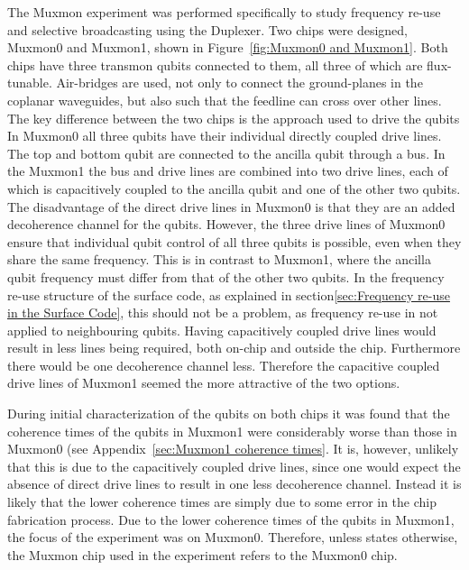       The Muxmon experiment was performed specifically to study frequency re-use and selective broadcasting using the Duplexer. Two chips were designed, Muxmon0 and Muxmon1, shown in Figure~\ref{fig:Muxmon0 and Muxmon1}. Both chips have three transmon qubits connected to them, all three of which are flux-tunable. Air-bridges are used, not only to connect the ground-planes in the coplanar waveguides, but also such that the feedline can cross over other lines. The key difference between the two chips is the approach used to drive the qubits In Muxmon0 all three qubits have their individual directly coupled drive lines. The top and bottom qubit are connected to the ancilla qubit through a bus. In the Muxmon1 the bus and drive lines are combined into two drive lines, each of which is capacitively coupled to the ancilla qubit and one of the other two qubits. The disadvantage of the direct drive lines in Muxmon0 is that they are an added decoherence channel for the qubits. However, the three drive lines of Muxmon0 ensure that individual qubit control of all three qubits is possible, even when they share the same frequency. This is in contrast to Muxmon1, where the ancilla qubit frequency must differ from that of the other two qubits. In the frequency re-use structure of the surface code, as explained in section\ref{sec:Frequency re-use in the Surface Code}, this should not be a problem, as frequency re-use in not applied to neighbouring qubits. Having capacitively coupled drive lines would result in less lines being required, both on-chip and outside the chip. Furthermore there would be one decoherence channel less. Therefore the capacitive coupled drive lines of Muxmon1 seemed the more attractive of the two options.

      During initial characterization of the qubits on both chips it was found that the coherence times of the qubits in Muxmon1 were considerably worse than those in Muxmon0 (see Appendix~\ref{sec:Muxmon1 coherence times}. It is, however, unlikely that this is due to the capacitively coupled drive lines, since one would expect the absence of direct drive lines to result in one less decoherence channel. Instead it is likely that the lower coherence times are simply due to some error in the chip fabrication process. Due to the lower coherence times of the qubits in Muxmon1, the focus of the experiment was on Muxmon0. Therefore, unless states otherwise, the Muxmon chip used in the experiment refers to the Muxmon0 chip.

